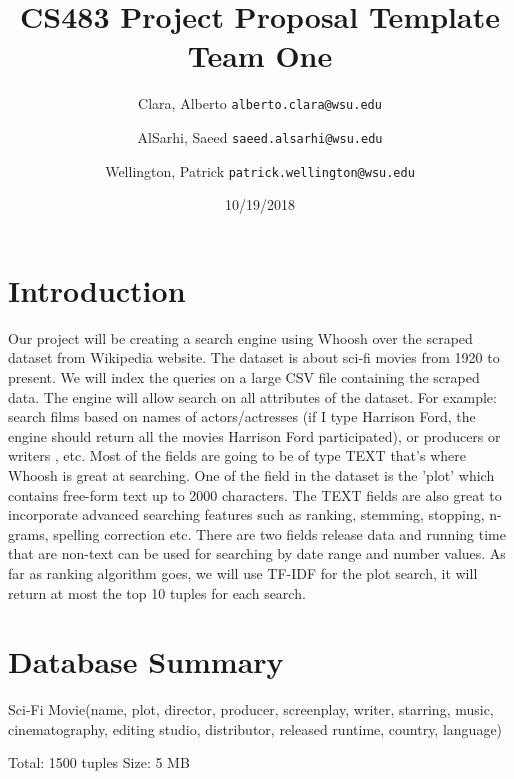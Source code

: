 \documentclass[11pt]{article}
\title{CS483 Project Proposal Template\\
\large Team One}
\author{
  Clara, Alberto      \texttt{alberto.clara@wsu.edu}
  \and
  AlSarhi, Saeed      \texttt{saeed.alsarhi@wsu.edu}
  \and
  Wellington, Patrick      \texttt{patrick.wellington@wsu.edu}
}
\date{10/19/2018}
\begin{document}
\maketitle

\section{Introduction}
Our project will be creating a search engine  using Whoosh over the scraped dataset from Wikipedia website. The dataset is about sci-fi movies from 1920 to present. We will index the queries on a large CSV file containing the scraped data. The engine will allow search on all attributes of the dataset. For example: search films based on names of actors/actresses (if I type Harrison Ford, the engine should return all the movies Harrison Ford participated), or producers or writers , etc.  Most of the fields are going to be of type TEXT that's where Whoosh is great at searching. One of the field in the dataset is the 'plot' which contains free-form text up to 2000 characters. The TEXT fields are also great to incorporate advanced searching features such as ranking, stemming, stopping, n-grams, spelling correction etc.  There are two fields release data and running time that are non-text can be used for searching by date range and number values. As far as ranking algorithm goes, we will use TF-IDF for the plot search, it will return at most the top 10 tuples for each search.

\section{Database Summary}
Sci-Fi Movie(name, plot, director, producer, screenplay, writer, starring, music, cinematography, editing studio, distributor, released runtime, country, language)
 
Total: 1500 tuples
Size: 5 MB
\end{document}
